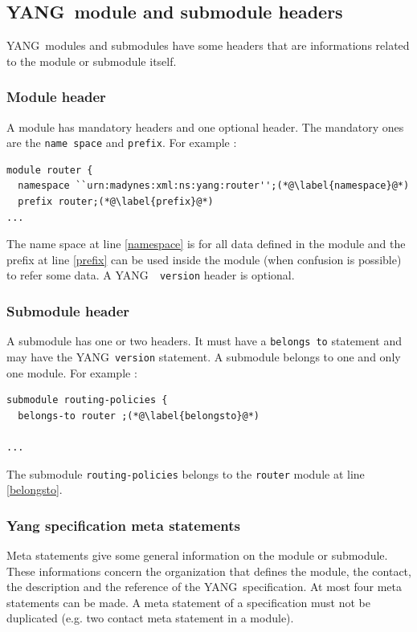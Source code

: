 \documentclass[a4paper]{article}
\newcommand{\y}{YANG}
\begin{document}
\subsection{\y\ module and submodule headers}

\y\  modules  and submodules  have  some  headers  that are  informations
related to the module or submodule itself.

\subsubsection{Module header}
\label{spec:module}

A module has mandatory headers and one optional header. The mandatory
ones are the {\tt name space} and {\tt prefix}.  For example :

\begin{lstlisting}
module router {
  namespace ``urn:madynes:xml:ns:yang:router'';(*@\label{namespace}@*)
  prefix router;(*@\label{prefix}@*)
...
\end{lstlisting}

The name space at line \ref{namespace}  is for all data defined in the
module  and the prefix  at line  \ref{prefix} can  be used  inside the
module (when  confusion is  possible) to refer  some data. A  \y\ {\tt
version} header is optional.

\subsubsection{Submodule header}
\label{spec:submodule}

A submodule has one or two headers. It must have a {\tt belongs
to} statement and may have the \y\ {\tt version} statement. A
submodule belongs to one and only one module. For example :

\begin{lstlisting}
submodule routing-policies {
  belongs-to router ;(*@\label{belongsto}@*)

...
\end{lstlisting}

The  submodule  {\tt routing-policies}  belongs  to  the {\tt  router}
module at line \ref{belongsto}.

\subsubsection{Yang specification meta statements}

Meta  statements  give some  general  information  on  the module  or
submodule.  These  informations  concern  the  organization  that
defines the module, the contact,  the description and the reference of
the  \y\ specification.   At most four meta statements can be made.
A meta statement of a  specification must not be duplicated (e.g. two
contact meta statement in a module).
\end{document}
